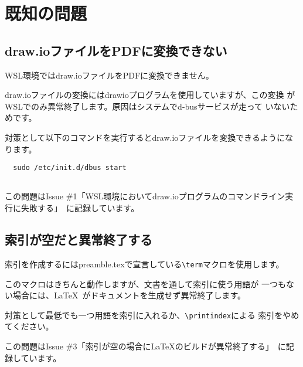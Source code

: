 \chapter{既知の問題}
\label{sec:appendix10}

\section{draw.ioファイルをPDFに変換できない}
WSL環境ではdraw.ioファイルをPDFに変換できません。

draw.ioファイルの変換にはdrawioプログラムを使用していますが、この変換
がWSLでのみ異常終了します。原因はシステムでd-busサービスが走って
いないためです。

対策として以下のコマンドを実行するとdraw.ioファイルを変換できるようになります。

\begin{lstlisting}
  sudo /etc/init.d/dbus start
  
\end{lstlisting}

この問題はIssue \#1「WSL環境においてdraw.ioプログラムのコマンドライン実行に失敗する」~\cite{ISSUE_1}に記録しています。

\section{索引が空だと異常終了する}
索引を作成するにはpreamble.texで宣言している\lstinline{\term}マクロを使用します。

このマクロはきちんと動作しますが、文書を通して索引に使う用語が
一つもない場合には、\LaTeX\ がドキュメントを生成せず異常終了します。

対策として最低でも一つ用語を索引に入れるか、\lstinline{\printindex}による
索引をやめてください。

この問題はIssue \#3「索引が空の場合にLaTeXのビルドが異常終了する」~\cite{ISSUE_3}に記録しています。
